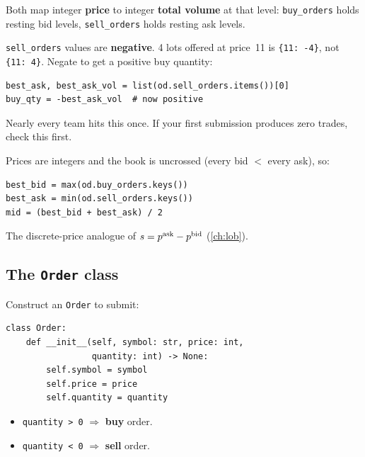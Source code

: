 Both map integer \textbf{price} to integer \textbf{total volume} at
that level: \texttt{buy\_orders} holds resting bid levels,
\texttt{sell\_orders} holds resting ask levels.

\begin{pitfallbox}
\texttt{sell\_orders} values are \textbf{negative}.  4 lots offered at
price~11 is \texttt{\{11: -4\}}, not \texttt{\{11: 4\}}.  Negate to get
a positive buy quantity:
\begin{lstlisting}[numbers=none, frame=none, backgroundcolor=\color{red!3}]
best_ask, best_ask_vol = list(od.sell_orders.items())[0]
buy_qty = -best_ask_vol  # now positive
\end{lstlisting}
Nearly every team hits this once.  If your first submission produces
zero trades, check this first.
\end{pitfallbox}

Prices are integers and the book is uncrossed (every bid $<$ every
ask), so:

\begin{lstlisting}[caption={Extracting best bid/ask and mid price.},
  label={lst:bestbidask}]
best_bid = max(od.buy_orders.keys())
best_ask = min(od.sell_orders.keys())
mid = (best_bid + best_ask) / 2
\end{lstlisting}

The discrete-price analogue of $s = p^{\mathrm{ask}} - p^{\mathrm{bid}}$
(\cref{ch:lob}).

\subsection{The \texttt{Order} class}

Construct an \texttt{Order} to submit:

\begin{lstlisting}[caption={\texttt{Order} class usage.},
  label={lst:order_class}]
class Order:
    def __init__(self, symbol: str, price: int,
                 quantity: int) -> None:
        self.symbol = symbol
        self.price = price
        self.quantity = quantity
\end{lstlisting}

\begin{itemize}
  \item \texttt{quantity > 0} $\Rightarrow$ \textbf{buy} order.
  \item \texttt{quantity < 0} $\Rightarrow$ \textbf{sell} order.
\end{itemize}

